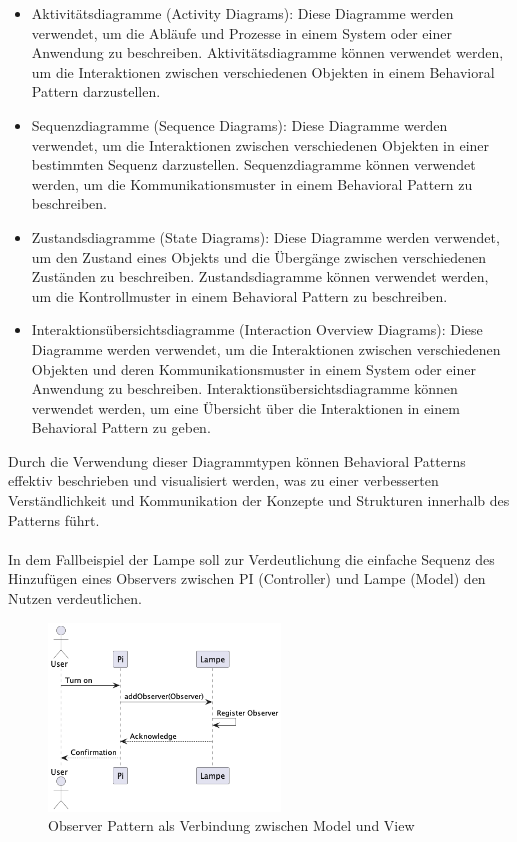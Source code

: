 \begin{itemize}
\item Aktivitätsdiagramme (Activity Diagrams): Diese Diagramme werden verwendet, um die Abläufe und Prozesse in einem System oder einer Anwendung zu beschreiben. Aktivitätsdiagramme können verwendet werden, um die Interaktionen zwischen verschiedenen Objekten in einem Behavioral Pattern darzustellen.
\item Sequenzdiagramme (Sequence Diagrams): Diese Diagramme werden verwendet, um die Interaktionen zwischen verschiedenen Objekten in einer bestimmten Sequenz darzustellen. Sequenzdiagramme können verwendet werden, um die Kommunikationsmuster in einem Behavioral Pattern zu beschreiben.
\item Zustandsdiagramme (State Diagrams): Diese Diagramme werden verwendet, um den Zustand eines Objekts und die Übergänge zwischen verschiedenen Zuständen zu beschreiben. Zustandsdiagramme können verwendet werden, um die Kontrollmuster in einem Behavioral Pattern zu beschreiben.
\item Interaktionsübersichtsdiagramme (Interaction Overview Diagrams): Diese Diagramme werden verwendet, um die Interaktionen zwischen verschiedenen Objekten und deren Kommunikationsmuster in einem System oder einer Anwendung zu beschreiben. Interaktionsübersichtsdiagramme können verwendet werden, um eine Übersicht über die Interaktionen in einem Behavioral Pattern zu geben.
\end{itemize}
Durch die Verwendung dieser Diagrammtypen können Behavioral Patterns effektiv beschrieben und visualisiert werden, was zu einer verbesserten Verständlichkeit und Kommunikation der Konzepte und Strukturen innerhalb des Patterns führt.
\\\\
In dem Fallbeispiel der Lampe soll zur Verdeutlichung die einfache Sequenz des Hinzufügen eines Observers zwischen PI (Controller) und Lampe (Model) den Nutzen verdeutlichen. 

\begin{figure}[ht]
  \centering
  \includegraphics[width=0.55\textwidth]{fig/uml/seq-mvc-observer.png}
  \caption{Observer Pattern als Verbindung zwischen Model und View}
  \label{fig:seq-mvc-observer}
\end{figure}

